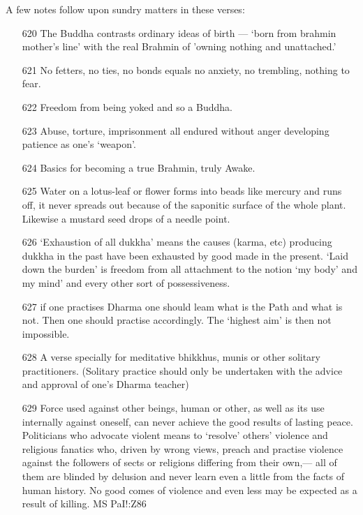  A few notes follow upon sundry matters in these verses:

\begin{itemize}
   
\item[620] The Buddha contrasts ordinary ideas of birth — `born from brahmin mother's line' with the real Brahmin of 'owning nothing and unattached.'

\item[621] No fetters, no ties, no bonds equals no anxiety, no trembling, nothing to fear.

\item[622] Freedom from being yoked and so a Buddha.

\item[623] Abuse, torture, imprisonment all endured without anger developing patience as one's `weapon'.

\item[624] Basics for becoming a true Brahmin, truly Awake.

\item[625] Water on a lotus-leaf or flower forms into beads like mercury and runs off, it never spreads out because of the saponitic surface of the whole plant. Likewise a mustard seed drops of a needle point.

\item[626] `Exhaustion of all dukkha' means the causes (karma, etc) producing dukkha in the past have been exhausted by good made in the present. `Laid down the burden' is freedom from all attachment to the notion `my body' and my mind' and every other sort of possessiveness.

\item[627] if one practises Dharma one should leam what is the Path and what is not. Then one should practise accordingly. The `highest aim' is then not impossible.

\item[628] A verse specially for meditative bhikkhus, munis or other solitary practitioners. (Solitary practice should only be undertaken with the advice and approval of one's Dharma teacher)

\item[629] Force used against other beings, human or other, as well as its use internally against oneself, can never achieve the good results of lasting peace. Politicians who advocate violent means to `resolve' others' violence and religious fanatics who, driven by wrong views, preach and practise violence against the followers of sects or religions differing from their own,— all of them are blinded by delusion and never learn even a little from the facts of human history. No good comes of violence and even less may be expected as a result of killing.
   MS PaI!:Z86
   

\end{itemize}
